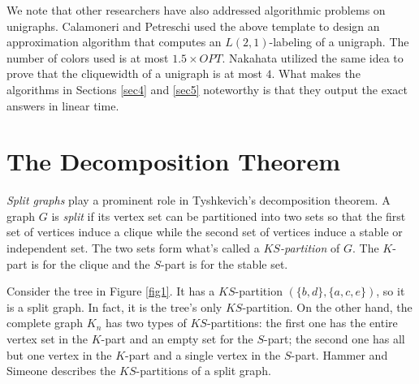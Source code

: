 \documentclass[11pt]{article}
\begin{document}
We note that other researchers have also addressed algorithmic problems on unigraphs.  Calamoneri and Petreschi \cite{CaPe11} used the above template to design an approximation algorithm that computes an $L(2,1)$-labeling of a unigraph.  The number of colors used  is at most $1.5 \times OPT$.   Nakahata \cite{Na22} utilized the same idea to prove that the cliquewidth of a unigraph is at most $4$.   What makes the algorithms  in Sections \ref{sec4} and \ref{sec5} noteworthy is that they output the exact answers in linear time.  





 
\section{The Decomposition Theorem}
\label{sec2}

	{\it Split graphs} play a prominent role in Tyshkevich's decomposition theorem.  A graph $G$ is {\it split} if its vertex set can be partitioned into two sets so that the first set of vertices induce a clique while the second set of vertices induce a stable or independent set.  The two sets form what's called a {\it $KS$-partition} of $G$. The $K$-part is for the clique and the $S$-part is for the stable set.   
	
	Consider the tree in Figure \ref{fig1}.  It has a $KS$-partition $(\{b,d\}, \{a, c, e\})$, so it is a split graph.  In fact, it is the tree's only $KS$-partition.  On the other hand, the complete graph $K_n$  has two types of $KS$-partitions:  the first one  has the entire vertex set in the $K$-part and an empty set for the $S$-part; the second one has all but one vertex in the $K$-part and a single vertex in the $S$-part.  Hammer and Simeone \cite{HaSi81} describes the $KS$-partitions of a split graph. 
	
\end{document}
